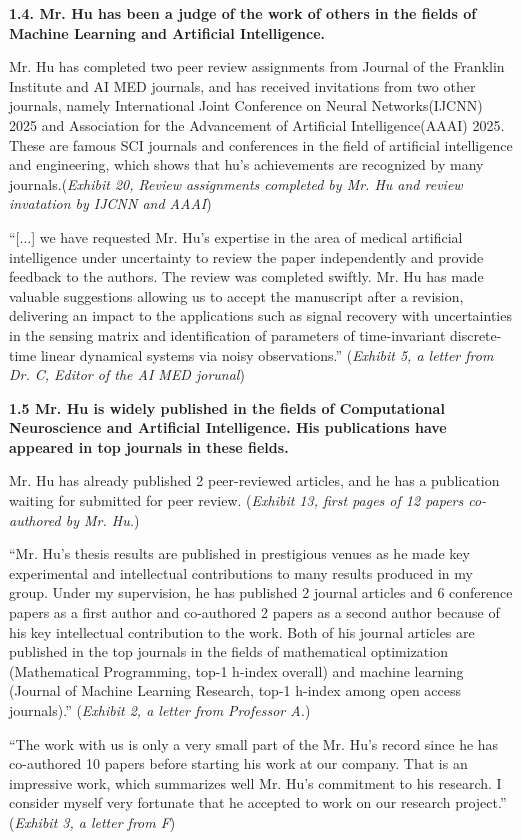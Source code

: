 \documentclass{article}
\begin{document}
{\bf 1.4. Mr. Hu has been a judge of the work of others in the fields of Machine Learning and Artificial Intelligence. }

Mr. Hu has completed two peer review assignments from Journal of the Franklin Institute and AI MED journals, and has received invitations from two other journals, namely International Joint Conference on Neural Networks(IJCNN) 2025 and Association for the Advancement of Artificial Intelligence(AAAI) 2025. These are famous SCI journals and conferences in the field of artificial intelligence and engineering, which shows that hu's achievements are recognized by many journals.({\it Exhibit 20, Review assignments completed by Mr. Hu and review invatation by IJCNN and AAAI})

“[...] we have requested Mr. Hu’s expertise in the area of medical artificial intelligence under uncertainty to review the paper independently and provide feedback to the authors. The review was completed swiftly. Mr. Hu has made valuable suggestions allowing us to accept the manuscript after a revision, delivering an impact to the applications such as signal recovery with uncertainties in the sensing matrix and identification of parameters of time-invariant discrete-time linear dynamical systems via noisy observations.” ({\it Exhibit 5, a letter from Dr. C, Editor of the AI MED jorunal}) 


{\bf 1.5 Mr. Hu is widely published in the fields of Computational Neuroscience and Artificial Intelligence. His publications have appeared in top journals in these fields.}

Mr. Hu has already published 2 peer-reviewed articles, and he has a publication waiting for submitted  for peer review. ({\it Exhibit 13, first pages of 12 papers co-authored by Mr. Hu.}) 

“Mr. Hu’s thesis results are published in prestigious venues as he made key experimental and intellectual contributions to many results produced in my group. Under my supervision, he has published 2 journal articles and 6 conference papers as a first author and co-authored 2 papers as a second author because of his key intellectual contribution to the work. Both of his journal articles are published in the top journals in the fields of mathematical optimization (Mathematical Programming, top-1 h-index overall) and machine learning (Journal of Machine Learning Research, top-1 h-index among open access journals).” ({\it Exhibit 2, a letter from Professor A.}) 

“The work with us is only a very small part of the Mr. Hu’s record since he has co-authored 10 papers before starting his work at our company. That is an impressive work, which summarizes well Mr. Hu’s commitment to his research. I consider myself very fortunate that he accepted to work on our research project.” ({\it Exhibit 3, a letter from F})
\end{document}
